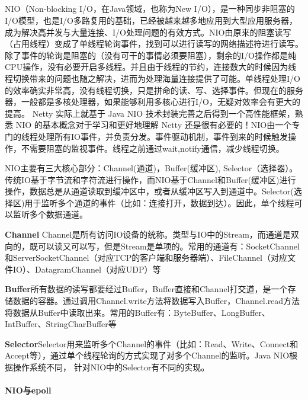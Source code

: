\documentclass[../../../interview-questions.tex]{subfiles}
\begin{document}
\subsection{\color{red}{Java NIO原理}}

NIO（Non-blocking I/O，在Java领域，也称为New I/O），是一种同步非阻塞的I/O模型，也是I/O多路复用的基础，已经被越来越多地应用到大型应用服务器，成为解决高并发与大量连接、I/O处理问题的有效方式。NIO由原来的阻塞读写（占用线程）变成了单线程轮询事件，找到可以进行读写的网络描述符进行读写。除了事件的轮询是阻塞的（没有可干的事情必须要阻塞），剩余的I/O操作都是纯CPU操作，没有必要开启多线程。并且由于线程的节约，连接数大的时候因为线程切换带来的问题也随之解决，进而为处理海量连接提供了可能。单线程处理I/O的效率确实非常高，没有线程切换，只是拼命的读、写、选择事件。但现在的服务器，一般都是多核处理器，如果能够利用多核心进行I/O，无疑对效率会有更大的提高。
Netty 实际上就基于 Java NIO 技术封装完善之后得到一个高性能框架，熟悉 NIO 的基本概念对于学习和更好地理解 Netty 还是很有必要的！NIO由一个专门的线程处理所有IO事件，并负责分发。事件驱动机制，事件到来的时候触发操作，不需要阻塞的监视事件。线程之前通过wait,notify通信，减少线程切换。

NIO主要有三大核心部分：Channel(通道)，Buffer(缓冲区), Selector（选择器）。传统IO基于字节流和字符流进行操作，而NIO基于Channel和Buffer(缓冲区)进行操作，数据总是从通道读取到缓冲区中，或者从缓冲区写入到通道中。Selector(选择区)用于监听多个通道的事件（比如：连接打开，数据到达）。因此，单个线程可以监听多个数据通道。

\textbf{Channel} Channel是所有访问IO设备的统称。类型与IO中的Stream，而通道是双向的，既可以读又可以写，但是Stream是单项的。常用的通道有：SocketChannel和ServerSocketChannel（对应TCP的客户端和服务器端）、FileChannel（对应文件IO）、DatagramChannel（对应UDP）等

\textbf{Buffer}所有数据的读写都要经过Buffer，Buffer直接和Channel打交道，是一个存储数据的容器。通过调用Channel.write方法将数据写入Buffer，Channel.read方法将数据从Buffer中读取出来。常用的Buffer有：ByteBuffer、LongBuffer、IntBuffer、StringCharBuffer等

\textbf{Selector}Selector用来监听多个Channel的事件（比如：Read、Write、Connect和Accept等），通过单个线程轮询的方式实现了对多个Channel的监听。Java NIO根据操作系统不同， 针对NIO中的Selector有不同的实现。



\paragraph{NIO与epoll}
\end{document}
